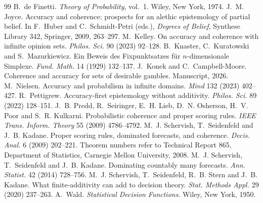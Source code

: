 \documentclass[11pt]{article}
\theoremstyle{definition}
\theoremstyle{remark}
\begin{document}
\begin{thebibliography}{99}
 B.~de Finetti. \emph{Theory of Probability}, vol.~1. Wiley, New York, 1974.
 J.~M. Joyce. Accuracy and coherence: prospects for an alethic epistemology of partial belief. In F.~Huber and C.~Schmidt-Petri (eds.), \emph{Degrees of Belief}, Synthese Library 342, Springer, 2009, 263--297.
 M.~Kelley. On accuracy and coherence with infinite opinion sets. \emph{Philos. Sci.} 90 (2023) 92--128.
 B.~Knaster, C.~Kuratowski and S.~Mazurkiewicz. Ein Beweis des Fixpunktsatzes f\"ur $n$-dimensionale Simplexe. \emph{Fund. Math.} 14 (1929) 132--137.
 J.~Konek and C.~Campbell-Moore. Coherence and accuracy for sets of desirable gambles. Manuscript, 2026.
 M.~Nielsen. Accuracy and probabilism in infinite domains. \emph{Mind} 132 (2023) 402--427.
 R.~Pettigrew. Accuracy-first epistemology without additivity. \emph{Philos. Sci.} 89 (2022) 128--151.
 J.~B. Predd, R.~Seiringer, E.~H. Lieb, D.~N. Osherson, H.~V. Poor and S.~R. Kulkarni. Probabilistic coherence and proper scoring rules. \emph{IEEE Trans. Inform. Theory} 55 (2009) 4786--4792.
 M.~J. Schervish, T.~Seidenfeld and J.~B. Kadane. Proper scoring rules, dominated forecasts, and coherence. \emph{Decis. Anal.} 6 (2009) 202--221. Theorem numbers refer to Technical Report 865, Department of Statistics, Carnegie Mellon University, 2008.
 M.~J. Schervish, T.~Seidenfeld and J.~B. Kadane. Dominating countably many forecasts. \emph{Ann. Statist.} 42 (2014) 728--756.
 M.~J. Schervish, T.~Seidenfeld, R.~B. Stern and J.~B. Kadane. What finite-additivity can add to decision theory. \emph{Stat. Methods Appl.} 29 (2020) 237--263.
 A.~Wald. \emph{Statistical Decision Functions}. Wiley, New York, 1950.
\end{thebibliography}
\end{document}
